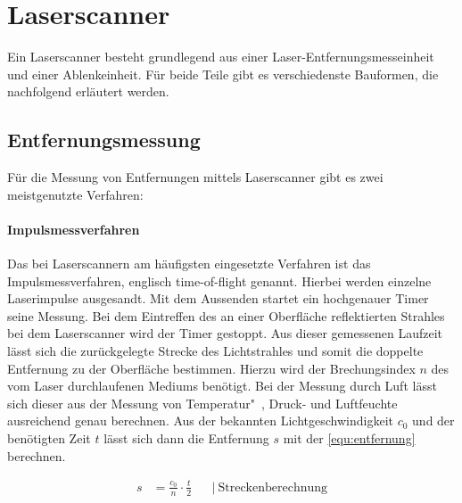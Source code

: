 \documentclass[a4paper,12pt,bibliography=totoc, listof=totoc,titlepage,pointlessnumbers]{scrreprt}
\begin{document}
\section{Laser\-scan\-ner}
Ein Laser\-scan\-ner besteht grundlegend aus einer Laser-Entfernungsmesseinheit und einer Ablenkeinheit. Für beide Teile gibt es verschiedenste Bauformen, die nachfolgend erläutert werden.

\subsection{Entfernungsmessung}
Für die Messung von Entfernungen mittels Laser\-scan\-ner gibt es zwei meistgenutzte Verfahren:

\paragraph{Impulsmessverfahren}
\label{p:tof}
Das bei Laser\-scan\-nern am häufigsten eingesetzte Verfahren ist das Impulsmessverfahren, englisch time-of-flight genannt. Hierbei werden einzelne Laserimpulse ausgesandt. Mit dem Aussenden startet ein hochgenauer Timer seine Messung. Bei dem Eintreffen des an einer Oberfläche reflektierten Strahles bei dem Laser\-scan\-ner wird der Timer gestoppt. Aus dieser gemessenen Laufzeit lässt sich die zurückgelegte Strecke des Lichtstrahles und somit die doppelte Entfernung zu der Oberfläche bestimmen. Hierzu wird der Brechungsindex \(n\) des vom Laser durchlaufenen Mediums benötigt. Bei der Messung durch Luft lässt sich dieser aus der Messung von Temperatur"~, Druck- und Luftfeuchte ausreichend genau berechnen. Aus der bekannten Lichtgeschwindigkeit \(c_0\) und der benötigten Zeit \(t\) lässt sich dann die Entfernung \(s\) mit der \autoref{equ:entfernung} berechnen.

\begin{equation}
\begin{aligned}
s &=  \frac{c_0}{n} \cdot \frac{t}{2}  && \left|\  \text{Streckenberechnung} \right. \\
\end{aligned}
\label{equ:entfernung}
\end{equation}
\end{document}
